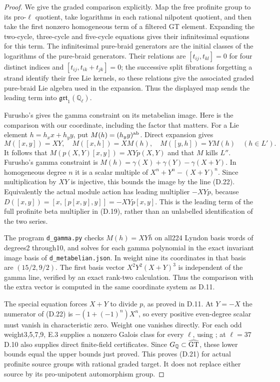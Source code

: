 \begin{proof}
We give the graded comparison explicitly. Map the free profinite group to its pro-$\ell$ quotient, take logarithms in each rational nilpotent quotient, and then take the first nonzero homogeneous term of a filtered GT element. Expanding the two-cycle, three-cycle and five-cycle equations gives their infinitesimal equations for this term. The infinitesimal pure-braid generators are the initial classes of the logarithms of the pure-braid generators. Their relations are
$[t_{ij},t_{kl}]=0$ for four distinct indices and
$[t_{ij},t_{ik}+t_{jk}]=0$; the successive split fibrations forgetting a strand identify their free Lie kernels, so these relations give the associated graded pure-braid Lie algebra used in the expansion. Thus the displayed map sends the leading term into $\mathfrak{grt}_1(\mathbb Q_\ell)$.

Furusho's \cite[Corollary0.3, Theorem0.5, Proposition5.1 and Lemma5.2]{dFurusho2011} gives the gamma constraint on its metabelian image. Here is the comparison with our coordinate, including the factor that matters. For a Lie element $h=h_xx+h_yy$, put $M(h)=(h_yy)^{\rm ab}$. Direct expansion gives
\[
 M([x,y])=XY,\quad M([x,h])=XM(h),\quad M([y,h])=YM(h)
 \quad(h\in L').
\]
It follows that $M(p(X,Y)[x,y])=XYp(X,Y)$ and that $M$ kills $L''$. Furusho's gamma constraint is
$M(h)=\gamma(X)+\gamma(Y)-\gamma(X+Y)$.
In homogeneous degree $n$ it is a scalar multiple of
$X^n+Y^n-(X+Y)^n$. Since multiplication by $XY$ is injective, this bounds the image by the line (D.22). Equivalently the actual module action has leading multiplier $-XYp$, because
$D([x,y])=[x,[p[x,y],y]]=-XYp[x,y]$.
This is the leading term of the full profinite beta multiplier in (D.19), rather than an unlabelled identification of the two series.

The program \texttt{d\_gamma.py} checks $M(h)=XY\bar h$ on all224 Lyndon basis words of degrees2 through10, and solves for each gamma polynomial in the exact invariant image basis of \texttt{d\_metabelian.json}. In weight nine its coordinates in that basis are $(15/2,9/2)$. The first basis vector $X^2Y^2(X+Y)^3$ is independent of the gamma line, verified by an exact rank-two calculation. Thus the comparison with the extra vector is computed in the same coordinate system as D.11.

The special equation forces $X+Y$ to divide $p$, as proved in D.11. At $Y=-X$ the numerator of (D.22) is $-(1+(-1)^n)X^n$, so every positive even-degree scalar must vanish in characteristic zero. Weight one vanishes directly. For each odd weight3,5,7,9, E.3 supplies a nonzero Galois class for every $\ell$, using \cite[Theorem8.4, \S8.4, Lemma8.5 and Remark8.6]{E_HainMatsumoto}; at $\ell=37$ D.10 also supplies direct finite-field certificates. Since $G_{\mathbb Q}\subset\widehat{\rm GT}$, these lower bounds equal the upper bounds just proved. This proves (D.21) for actual profinite source groups with rational graded target. It does not replace either source by its pro-unipotent automorphism group.
\end{proof}

